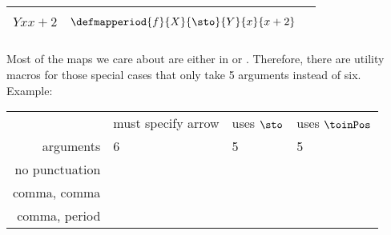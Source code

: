 \begin{widepar}
\begin{tabular}{|c|c|c|}
\begin{minipage}{0.3\textwidth}
\begin{equation}
{                }{
                    Y
                }{
                    x
                }{
                    x + 2
                }
            \end{equation}
        \end{minipage}
         &
        \begin{minipage}{0.3\textwidth}
            \begin{equation}
                \defmapperiod{
                    f
                }{
                    X
                }{
                    \sto
                }{
                    Y
                }{
                    x
                }{
                    x + 2
                }
            \end{equation}
        \end{minipage}
        \\\hline
    \end{tabular}
\end{widepar}
Most of the maps we care about are either in \Set or \Pos.
Therefore, there are utility macros for those special cases that only take 5 arguments instead of six.
Example:

\begin{widepar}
    \begin{tabular}{rlll}
                       & must specify arrow                           & uses $\sto$            & uses $\toinPos$ \\
        arguments      & 6                                            & 5                      & 5 \\
        no punctuation & \str{\defmap}       & \str{\defmapset}       & \str{\defmappos} \\
        comma, comma   & \str{\defmapcomma}  & \str{\defmapcommaset}  & \str{\defmapcommapos} \\
        comma, period  & \str{\defmapperiod} & \str{\defmapperiodset} & \str{\defmapperiodpos} \\
    \end{tabular}
\end{widepar}

